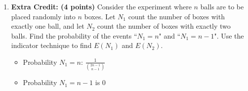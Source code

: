 \documentclass[11pt]{article}
\begin{document}
\begin{enumerate}
\item \textbf{Extra Credit: (4 points)} Consider the experiment where $n$ balls
are to be placed randomly into $n$ boxes. Let $N_1$ count the number of boxes
with exactly one ball, and let $N_2$ count the number of boxes with exactly two
balls. Find the probability of the events ``$N_1 = n$" and ``$N_1 = n - 1$".
Use the indicator technique to find $E(N_1)$ and $E(N_2)$.

\begin{itemize}
	\item Probability $N_1 = n$: $\frac{1}{{2n-1\choose n-1}}$
	\item Probability $N_1 = n-1$ is $0$
\end{itemize}


\end{enumerate}
\end{document}
